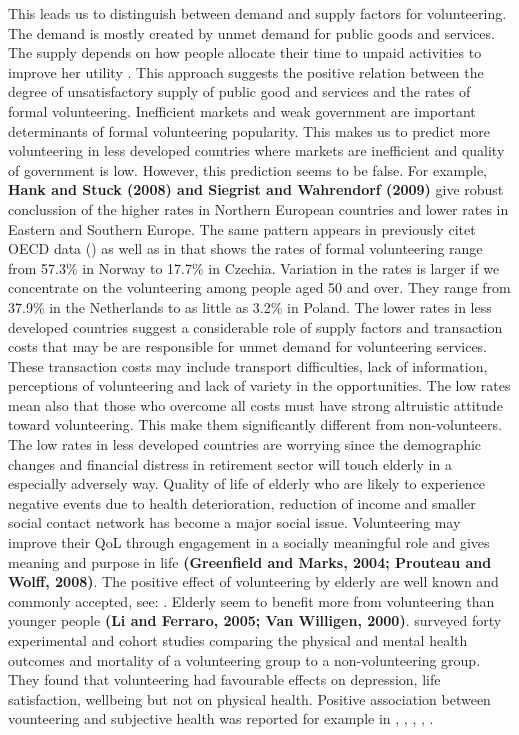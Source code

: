 \documentclass[10pt, letterpaper]{article}
\begin{document}
\begin{spacing}{1.4}
This leads us to distinguish between demand and supply factors for volunteering. The demand is mostly created by unmet demand for public goods and services. The supply depends on how people allocate their time to unpaid activities to improve her utility \citet{ziemek06}. This approach  suggests the positive relation between the degree of unsatisfactory supply of public good and services and the rates of formal volunteering. Inefficient markets and weak government are important determinants of formal volunteering popularity. This makes us to predict more volunteering in less developed countries where markets are inefficient and quality of government is low. However, this prediction seems to be false. For example, \textbf{Hank and Stuck (2008) and Siegrist and Wahrendorf (2009)}  give robust conclussion of the higher rates in Northern European countries and lower rates in Eastern and Southern Europe. The same pattern appears in previously citet OECD data (\citet{Oecd16}) as well as in  \citet{Oecd15} that shows the rates of formal volunteering range from 57.3\% in Norway to 17.7\% in Czechia. Variation in the rates is larger if we concentrate on the volunteering among people aged 50 and over. They range from 37.9\% in the Netherlands to as little as 3.2\% in Poland. The lower rates in less developed countries suggest a considerable role of supply factors and transaction costs that may be are responsible for unmet demand for volunteering services. These transaction costs may include transport difficulties, lack of information, perceptions of volunteering and lack of variety in the opportunities. The low rates mean also that those who overcome all costs must have strong altruistic attitude toward volunteering. This make them significantly different from non-volunteers.  \\

The low rates in less developed countries are worrying since the demographic changes and financial distress in retirement sector  will touch elderly in a especially adversely way. Quality of life of elderly who are likely to experience negative events due to health deterioration, reduction of income and smaller social contact network has become a major social issue. Volunteering may improve their QoL through engagement in a socially meaningful role and  gives meaning and purpose in life \textbf{(Greenfield and Marks, 2004; Prouteau and Wolff, 2008)}. The positive effect of volunteering by elderly are well known and commonly accepted, see:  \citet{morrow10}. Elderly seem to benefit more from volunteering than younger people \textbf{(Li and Ferraro, 2005; Van Willigen, 2000)}. \citet{jenkinson2013volunteering} surveyed forty experimental and cohort studies comparing the physical and mental health outcomes and mortality of a volunteering group to a non-volunteering group. They found that volunteering had favourable effects on depression, life satisfaction, wellbeing but not on physical health. Positive association between vounteering and subjective health was reported for example in  \citet{borgonovi08}, \cite{anderson14}, \cite{li06}, \cite{VanWilligen00}, \citet{detollenaere17}. \\ 


\end{spacing}
\end{document}
